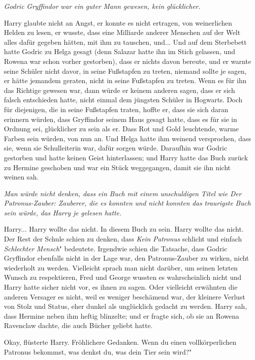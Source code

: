 \emph{Godric Gryffindor war ein guter Mann gewesen, kein glücklicher.}

Harry glaubte nicht an Angst, er konnte es nicht ertragen, von weinerlichen
Helden zu lesen, er wusste, dass eine Milliarde anderer Menschen auf der Welt
alles dafür gegeben hätten, mit ihm zu tauschen, und... Und auf dem Sterbebett
hatte Godric zu Helga gesagt (denn Salazar hatte ihn im Stich gelassen, und
Rowena war schon vorher gestorben), dass er nichts davon bereute, und er warnte
seine Schüler nicht davor, in seine Fußstapfen zu treten, niemand sollte je
sagen, er hätte jemandem geraten, nicht in seine Fußstapfen zu treten. Wenn es
für ihn das Richtige gewesen war, dann würde er keinem anderen sagen, dass er
sich falsch entschieden hatte, nicht einmal dem jüngsten Schüler in Hogwarts.
Doch für diejenigen, die in seine Fußstapfen traten, hoffte er, dass sie sich
daran erinnern würden, dass Gryffindor seinem Haus gesagt hatte, dass es für sie
in Ordnung sei, glücklicher zu sein als er. Dass Rot und Gold leuchtende, warme
Farben sein würden, von nun an. Und Helga hatte ihm weinend versprochen, dass
sie, wenn sie Schulleiterin war, dafür sorgen würde. Daraufhin war Godric
gestorben und hatte keinen Geist hinterlassen; und Harry hatte das Buch zurück
zu Hermine geschoben und war ein Stück weggegangen, damit sie ihn nicht weinen
sah.

\emph{ Man würde nicht denken, dass ein Buch mit einem unschuldigen Titel wie
\glqq Der Patronus-Zauber: Zauberer, die es konnten und nicht konnten\grqq{} das
traurigste Buch sein würde, das Harry je gelesen hatte.}

Harry... Harry wollte das nicht. In diesem Buch zu sein. Harry wollte das nicht.
Der Rest der Schule schien zu denken, dass \glqq \emph{Kein Patronus}\grqq{}
schlicht und einfach \glqq \emph{Schlechter Mensch}" bedeutete. Irgendwie schien
die Tatsache, dass Godric Gryffindor ebenfalls nicht in der Lage war, den
Patronus-Zauber zu wirken, nicht wiederholt zu werden. Vielleicht sprach man
nicht darüber, um seinen letzten Wunsch zu respektieren, Fred und George wussten
es wahrscheinlich nicht und Harry hatte sicher nicht vor, es ihnen zu sagen.
Oder vielleicht erwähnten die anderen Versager es nicht, weil es weniger
beschämend war, der kleinere Verlust von Stolz und Status, eher dunkel als
unglücklich gedacht zu werden. Harry sah, dass Hermine neben ihm heftig
blinzelte; und er fragte sich, ob sie an Rowena Ravenclaw dachte, die auch
Bücher geliebt hatte.

\glqq Okay\grqq{}, flüsterte Harry. \glqq Fröhlichere Gedanken. Wenn du einen
vollkörperlichen Patronus bekommst, was denkst du, was dein Tier sein wird?"

